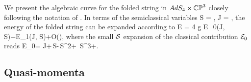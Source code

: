 We present the algebraic curve for the folded string in $AdS_{4}\times \mathbb{CP}^{3}$ closely following  the notation of  \cite{Gromov:2008fy}. In terms of the semiclassical variables
\beq
\mathcal S = , \qquad
\mathcal J = ,
\eeq
the energy of the folded string can be expanded according to 
\beq
E = 4\,\pi\,g\,\,\mc E_{0}(\mc J, \mc S)+E_{1}(\mc J, \mc S)+\mc O\left(\right),
\eeq
where the small $\mathcal S$ expansion of the classical contribution $\mathcal E_{0}$ reads
\beq
\label{eq:classical}
 \mathcal E_{0}= \mathcal J+\,\mathcal S-\,\mathcal S^{2}+ 
 \,\mathcal S^{3}+\cdots.
\eeq

\subsection{Quasi-momenta}


